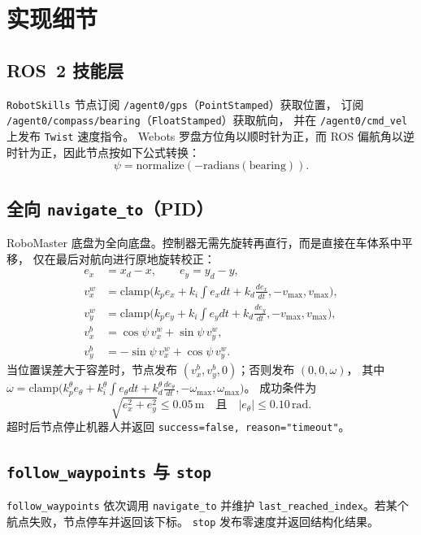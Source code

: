 \documentclass[10pt,twocolumn]{ctexart}
\begin{document}
\section{实现细节}
\label{sec:impl}

\subsection{ROS~2 技能层}
\texttt{RobotSkills} 节点订阅 \texttt{/agent0/gps}（\texttt{PointStamped}）获取位置，
订阅 \texttt{/agent0/compass/bearing}（\texttt{FloatStamped}）获取航向，
并在 \texttt{/agent0/cmd\_vel} 上发布 \texttt{Twist} 速度指令。
Webots 罗盘方位角以顺时针为正，而 ROS 偏航角以逆时针为正，因此节点按如下公式转换：
\begin{equation}
  \psi = \mathrm{normalize}(-\mathrm{radians}(\mathrm{bearing})).
\end{equation}

\subsection{全向 \texttt{navigate\_to}（PID）}
RoboMaster 底盘为全向底盘。控制器无需先旋转再直行，而是直接在车体系中平移，
仅在最后对航向进行原地旋转校正：
\begin{align}
  e_x &= x_d - x, \qquad e_y = y_d - y, \\
  v_x^{w} &= \mathrm{clamp}\big(k_p e_x + k_i \textstyle\int e_x dt + k_d \tfrac{d e_x}{dt}, -v_{\max}, v_{\max}\big), \\
  v_y^{w} &= \mathrm{clamp}\big(k_p e_y + k_i \textstyle\int e_y dt + k_d \tfrac{d e_y}{dt}, -v_{\max}, v_{\max}\big), \\
  v_x^{b} &= \cos\psi\, v_x^{w} + \sin\psi\, v_y^{w}, \\
  v_y^{b} &= -\sin\psi\, v_x^{w} + \cos\psi\, v_y^{w}.
\end{align}
当位置误差大于容差时，节点发布 $(v_x^{b}, v_y^{b}, 0)$；否则发布 $(0,0,\omega)$，
其中 $\omega = \mathrm{clamp}\big(k_p^\theta e_\theta + k_i^\theta \textstyle\int e_\theta dt + k_d^\theta \tfrac{d e_\theta}{dt}, -\omega_{\max}, \omega_{\max}\big)$。
成功条件为
\begin{equation}
  \sqrt{e_x^2+e_y^2} \le 0.05\,\mathrm{m}
  \quad\text{且}\quad |e_\theta| \le 0.10\,\mathrm{rad}.
\end{equation}
超时后节点停止机器人并返回 \texttt{success=false, reason="timeout"}。

\subsection{\texttt{follow\_waypoints} 与 \texttt{stop}}
\texttt{follow\_waypoints} 依次调用 \texttt{navigate\_to} 并维护
\texttt{last\_reached\_index}。若某个航点失败，节点停车并返回该下标。
\texttt{stop} 发布零速度并返回结构化结果。
\end{document}
